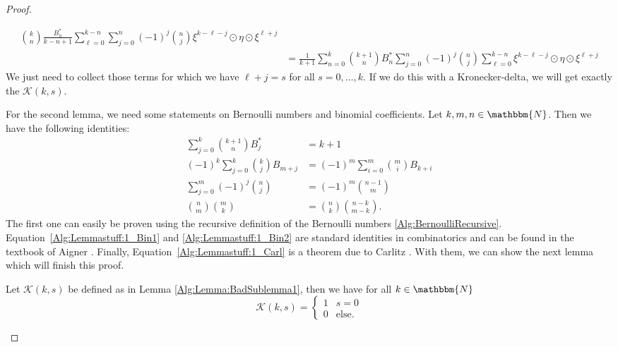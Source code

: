 \begin{proof}
\begin{subproof}
\begin{align*}
			\binom{k}{n} \frac{B_n^*}{k-n+1}
			\sum\limits_{\ell=0}^{k-n}
			\sum\limits_{j=0}^n
			(-1)^j \binom{n}{j} 
			\xi^{k-\ell-j} \odot \eta \odot \xi^{\ell+j} 
			\\	
			& = 
			\frac{1}{k + 1} \sum\limits_{n=0}^k
			\binom{k+1}{n} B_n^*
			\sum\limits_{j=0}^n (-1)^j \binom{n}{j}
			\sum\limits_{\ell=0}^{k-n}
			\xi^{k-\ell-j} \odot \eta \odot \xi^{\ell+j}
		\end{align*}
		We just need to collect those terms for which we have $\ell + j = s$
		for all	$s = 0, \ldots, k$. If we do this with a Kronecker-delta, we 
		will get exactly the $\mathcal{K}(k, s)$.
	\end{subproof}
	For the second lemma, we need some statements on Bernoulli numbers and 
	binomial coefficients. Let $k,m,n \in \mathbbm{N}$. Then we have the 
	following identities:
	\begin{align}
		\label{Alg:Lemmastuff:1_B1}
		\sum\limits_{j=0}^k
		\binom{k+1}{n} B_j^* 
		& = k+1 \\
		\label{Alg:Lemmastuff:1_Carl}
		(-1)^k \sum\limits_{j=0}^k
		\binom{k}{j} B_{m+j} 
		& = 
		(-1)^m \sum\limits_{i=0}^m 
		\binom{m}{i} B_{k+i} \\
		\label{Alg:Lemmastuff:1_Bin1} 
		\sum\limits_{j=0}^m
		(-1)^j \binom{n}{j} 
		& = 
		(-1)^m \binom{n-1}{m} \\
		\label{Alg:Lemmastuff:1_Bin2}
		\binom{n}{m}\binom{m}{k}
		& =
		\binom{n}{k}\binom{n-k}{m-k}.
	\end{align}
	The first one can easily be proven using the recursive definition of the 
	Bernoulli numbers \eqref{Alg:BernoulliRecursive}.
	Equation~\eqref{Alg:Lemmastuff:1_Bin1} and \eqref{Alg:Lemmastuff:1_Bin2} 
	are standard identities in combinatorics and can be found in the textbook 
	of Aigner \cite{aigner:2000a}. Finally, 
	Equation~\eqref{Alg:Lemmastuff:1_Carl} is a theorem due to Carlitz 
	\cite{carlitz:1968a}. With them, we can show the next lemma which will 
	finish this proof.
	\begin{lemma}
		\label{Alg:Lemma:BadSublemma2}
		Let $\mathcal{K}(k,s)$ be defined as in Lemma 
		\ref{Alg:Lemma:BadSublemma1}, then we have for all $k\in \mathbbm{N}$
		\begin{equation*}
			\mathcal{K}(k, s)
			=
			\begin{cases}
				1 & s=0 \\
				0 & \text{else}.		
			\end{cases}
		\end{equation*}
	\end{lemma}

\end{proof}
